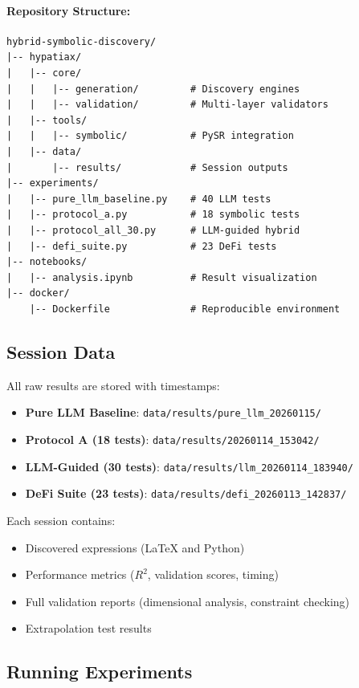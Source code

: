 \paragraph{Repository Structure:}
\begin{small}
\begin{verbatim}
hybrid-symbolic-discovery/
|-- hypatiax/
|   |-- core/
|   |   |-- generation/         # Discovery engines
|   |   |-- validation/         # Multi-layer validators
|   |-- tools/
|   |   |-- symbolic/           # PySR integration
|   |-- data/
|       |-- results/            # Session outputs
|-- experiments/
|   |-- pure_llm_baseline.py    # 40 LLM tests
|   |-- protocol_a.py           # 18 symbolic tests
|   |-- protocol_all_30.py      # LLM-guided hybrid
|   |-- defi_suite.py           # 23 DeFi tests
|-- notebooks/
|   |-- analysis.ipynb          # Result visualization
|-- docker/
    |-- Dockerfile              # Reproducible environment
\end{verbatim}
\end{small}

\subsection{Session Data}

All raw results are stored with timestamps:

\begin{itemize}
\item \textbf{Pure LLM Baseline}: \texttt{data/results/pure\_llm\_20260115/}
\item \textbf{Protocol A (18 tests)}: \texttt{data/results/20260114\_153042/}
\item \textbf{LLM-Guided (30 tests)}: \texttt{data/results/llm\_20260114\_183940/}
\item \textbf{DeFi Suite (23 tests)}: \texttt{data/results/defi\_20260113\_142837/}
\end{itemize}

Each session contains:
\begin{itemize}
\item Discovered expressions (LaTeX and Python)
\item Performance metrics ($R^2$, validation scores, timing)
\item Full validation reports (dimensional analysis, constraint checking)
\item Extrapolation test results
\end{itemize}

\subsection{Running Experiments}

